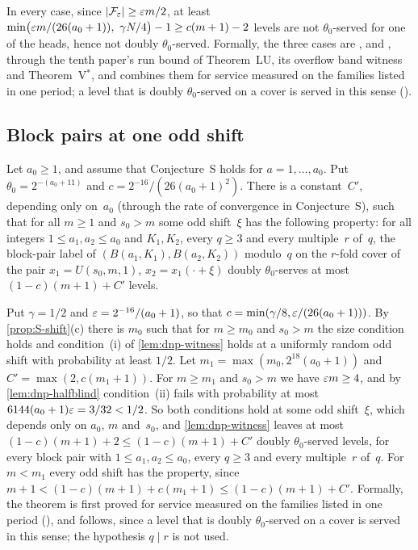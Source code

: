 \begin{outline}
In every case, since $\lvert \mathcal F_\varepsilon \rvert\ge\varepsilon m/2$, at least
$\min\bigl(\varepsilon m/(26(a_0+1)),\ \gamma N/4\bigr)-1\ge c(m+1)-2$ levels are not $\theta_0$-served for one of the heads,
hence not doubly $\theta_0$-served.
Formally, the three cases are ,  and
, through the tenth paper's run bound of Theorem~LU, its overflow band witness and
Theorem~V$^*$, and  combines them for service measured on the families listed in one
period; a level that is doubly $\theta_0$-served on a cover is served in this sense
().
\end{outline}

\subsection{Block pairs at one odd shift}\label{sec:dnp-BP}

\begin{theorem}\label{thm:BP}
Let $a_0\ge1$, and assume that Conjecture~S holds for $a=1,\dots,a_0$. Put $\theta_0=2^{-(a_0+11)}$ and
$c=2^{-16}/(26(a_0+1)^2)$. There is a constant~$C'$, depending only on~$a_0$ (through the rate of convergence in
Conjecture~S), such that for all $m\ge1$ and $s_0>m$ some odd shift~$\xi$ has the following property: for all integers
$1\le a_1,a_2\le a_0$ and $K_1,K_2$, every $q\ge3$ and every multiple~$r$ of~$q$, the block-pair label of
$(B(a_1,K_1),B(a_2,K_2))$ modulo~$q$ on the $r$-fold cover of the pair $x_1=U(s_0,m,1)$, $x_2=x_1(\cdot+\xi)$ doubly
$\theta_0$-serves at most $(1-c)(m+1)+C'$ levels.
\end{theorem}

\begin{outline}
Put $\gamma=1/2$ and $\varepsilon=2^{-16}/(a_0+1)$, so that $c=\min(\gamma/8,\varepsilon/(26(a_0+1)))$. By \cref{prop:S-shift}(c) there
is $m_0$ such that for $m\ge m_0$ and $s_0>m$ the size condition holds and condition~(i) of \cref{lem:dnp-witness} holds at
a uniformly random odd shift with probability at least $1/2$. Let $m_1=\max(m_0,2^{18}(a_0+1))$ and $C'=\max(2,c(m_1+1))$.
For $m\ge m_1$ and $s_0>m$ we have $\varepsilon m\ge4$, and by \cref{lem:dnp-halfblind} condition~(ii) fails with probability at
most $6144(a_0+1)\varepsilon=3/32<1/2$. So both conditions hold at some odd shift~$\xi$, which depends only on $a_0$, $m$
and~$s_0$, and \cref{lem:dnp-witness} leaves at most $(1-c)(m+1)+2\le(1-c)(m+1)+C'$ doubly $\theta_0$-served levels, for
every block pair with $1\le a_1,a_2\le a_0$, every $q\ge3$ and every multiple~$r$ of~$q$. For $m<m_1$ every odd shift has
the property, since $m+1<(1-c)(m+1)+c(m_1+1)\le(1-c)(m+1)+C'$.
Formally, the theorem is first proved for service measured on the families listed in one period
(), and  follows, since a level that is doubly
$\theta_0$-served on a cover is served in this sense; the hypothesis $q\mid r$ is not used.
\end{outline}

